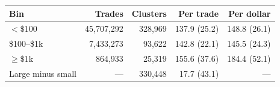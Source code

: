 \begin{tabular}{lrrrr}
\toprule
Bin & Trades & Clusters & Per trade & Per dollar \\
\midrule
$<\$100$ & 45,707,292 & 328,969 & 137.9 (25.2) & 148.8 (26.1) \\
\$100--\$1k & 7,433,273 & 93,622 & 142.8 (22.1) & 145.5 (24.3) \\
$\ge\$1$k & 864,933 & 25,319 & 155.6 (37.6) & 184.4 (52.1) \\
Large minus small & --- & 330,448 & 17.7 (43.1) & --- \\
\bottomrule
\end{tabular}
